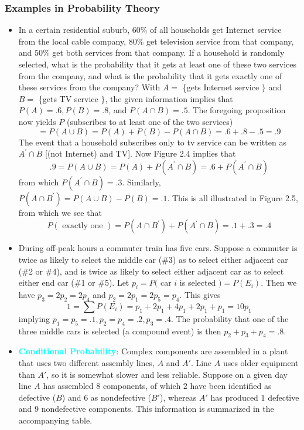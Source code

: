 \documentclass{report}
\begin{document}
    \subsubsection{Examples in Probability Theory}
    \bigbreak \noindent 
    \begin{itemize}
        \item In a certain residential suburb, $60 \%$ of all households get Internet service from the local cable company, $80 \%$ get television service from that company, and $50 \%$ get both services from that company. If a household is randomly selected, what is the probability that it gets at least one of these two services from the company, and what is the probability that it gets exactly one of these services from the company?
            With $A=$ \{gets Internet service $\}$ and $B=$ \{gets TV service $\}$, the given information implies that $P(A)=.6, P(B)=.8$, and $P(A \cap B)=.5$. The foregoing proposition now yields
            $P$ (subscribes to at least one of the two services)
            $$
            =P(A \cup B)=P(A)+P(B)-P(A \cap B)=.6+.8-.5=.9
            $$
            The event that a household subscribes only to tv service can be written as $A^{\prime} \cap B$ [(not Internet) and TV]. Now Figure 2.4 implies that
            $$
            .9=P(A \cup B)=P(A)+P\left(A^{\prime} \cap B\right)=.6+P\left(A^{\prime} \cap B\right)
            $$
            from which $P\left(A^{\prime} \cap B\right)=.3$. Similarly, $P\left(A \cap B^{\prime}\right)=P(A \cup B)-P(B)=.1$. This is all illustrated in Figure 2.5, from which we see that
            $$
            P(\text { exactly one })=P\left(A \cap B^{\prime}\right)+P\left(A^{\prime} \cap B\right)=.1+.3=.4
            $$
        \item During off-peak hours a commuter train has five cars. Suppose a commuter is twice as likely to select the middle car (\#3) as to select either adjacent car (\#2 or \#4), and is twice as likely to select either adjacent car as to select either end car (\#1 or \#5). Let $p_i=P($ car $i$ is selected $)=P\left(E_i\right)$. Then we have $p_3=2 p_2=2 p_4$ and $p_2=2 p_1=2 p_5=p_4$. This gives
            $$
            1=\sum P\left(E_i\right)=p_1+2 p_1+4 p_1+2 p_1+p_1=10 p_1
            $$
            implying $p_1=p_5=.1, p_2=p_4=.2, p_3=.4$. The probability that one of the three middle cars is selected (a compound event) is then $p_2+p_3+p_4=.8$.
        \item \textbf{\textcolor{cyan}{Conditional Probability}}:
            Complex components are assembled in a plant that uses two different assembly lines, $A$ and $A'$. Line $A$ uses older equipment than $A'$, so it is somewhat slower and less reliable. Suppose on a given day line $A$ has assembled 8 components, of which 2 have been identified as defective ($B$) and 6 as nondefective ($B'$), whereas $A'$ has produced 1 defective and 9 nondefective components. This information is summarized in the accompanying table.


\end{itemize}
\end{document}

